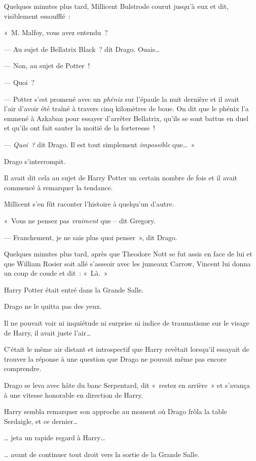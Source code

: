 Quelques minutes plus tard, Millicent Bulstrode courut jusqu'à eux et dit, visiblement essoufflé~:

«~M. Malfoy, vous avez entendu~?

--- Au sujet de Bellatrix Black~? dit Drago.
Ouais…

--- Non, au sujet de Potter~!

--- Quoi~?

--- Potter s'est promené avec un \emph{phénix} sur l'épaule la nuit dernière et il avait l'air d'avoir été traîné à travers cinq kilomètres de boue.
On dit que le phénix l'a emmené à Azkaban pour essayer d'arrêter Bellatrix, qu'ils se sont battus en duel et qu'ils ont fait sauter la moitié de la forteresse~!

--- \emph{Quoi~?} dit Drago.
Il est tout simplement \emph{impossible} que…~»

Drago s'interrompit.

Il avait dit cela au sujet de Harry Potter un certain nombre de fois et il avait commencé à remarquer la tendance.

Millicent s'en fût raconter l'histoire à quelqu'un d'autre.

«~Vous ne pensez pas \emph{vraiment} que -- dit Gregory.

--- Franchement, je ne sais plus quoi penser~», dit Drago.

Quelques minutes plus tard, après que Theodore Nott se fut assis en face de lui et que William Rosier soit allé s'asseoir avec les jumeaux Carrow, Vincent lui donna un coup de coude et dit~: «~Là.~»

Harry Potter était entré dans la Grande Salle.

Drago ne le quitta pas des yeux.

Il ne pouvait voir ni inquiétude ni surprise ni indice de traumatisme sur le visage de Harry, il avait juste l'air…

C'était le même air distant et introspectif que Harry revêtait lorsqu'il essayait de trouver la réponse à une question que Drago ne pouvait même pas encore comprendre.

Drago se leva avec hâte du banc Serpentard, dit «~restez en arrière~» et s'avança à une vitesse honorable en direction de Harry.

Harry sembla remarquer son approche au moment où Drago frôla la table Serdaigle, et ce dernier…

… jeta un rapide regard à Harry…

… avant de continuer tout droit vers la sortie de la Grande Salle.

